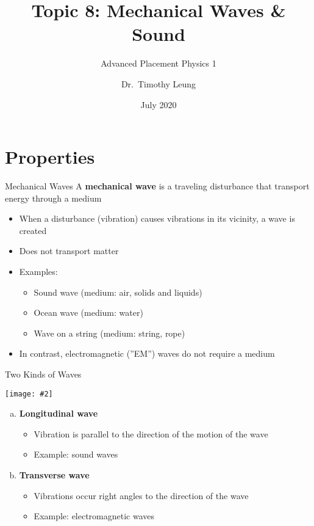\documentclass[12pt,aspectratio=169]{beamer}
\title[Waves]{Topic 8: Mechanical Waves \& Sound}
\subtitle{Advanced Placement Physics 1}
\author[TML]{Dr.\ Timothy Leung}
\institute{Olympiads School\\Toronto, Ontario, Canada}
\date{July 2020}
\newcommand{\pic}[2]{\texttt{[image: \#2]}}
\begin{document}
\begin{frame}
  \titlepage
\end{frame}



\section{Properties}

\begin{frame}{Mechanical Waves}
  A \textbf{mechanical wave} is a traveling disturbance that transport energy
  through a medium
  \begin{itemize}
  \item When a disturbance (vibration) causes vibrations in its vicinity, a
    wave is created
  \item Does not transport matter
  \item Examples:
    \begin{itemize}
    \item Sound wave (medium: air, solids and liquids)
    \item Ocean wave (medium: water)
    \item Wave on a string (medium: string, rope)
    \end{itemize}
  \item In contrast, electromagnetic (''EM'') waves do not require a medium
  \end{itemize}
\end{frame}




\begin{frame}{Two Kinds of Waves}
  \begin{center}
    \pic{.6}{main-qimg.png}
  \end{center}
  \begin{enumerate}[a.]
  \item\textbf{Longitudinal wave}
    \begin{itemize}
    \item Vibration is parallel to the direction of the motion of the wave
    \item Example: sound waves
    \end{itemize}
  \item\textbf{Transverse wave}
    \begin{itemize}
    \item Vibrations occur right angles to the direction of the wave
    \item Example: electromagnetic waves
    \end{itemize}
  \end{enumerate}
\end{frame}
\end{document}
